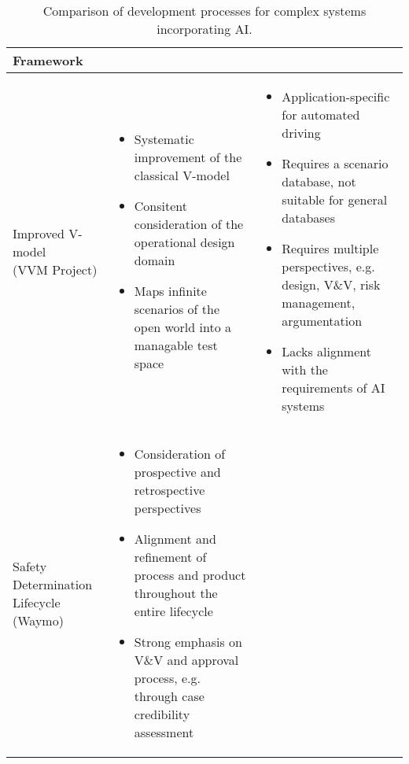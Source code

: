 \begin{table*}[]
	\centering
	\caption{Comparison of development processes for complex systems incorporating AI.}
	\begin{tabularx}{\linewidth}{l *{2}{>{\raggedright\arraybackslash}X}}
		\toprule
		Framework	& \makecell{Advantages} & \makecell{Disadvantages}  \\
		\midrule
		\makecell[l]{Improved V-model \\ \tiny{(VVM Project)}} \vspace*{-0.4cm} &  \vspace*{-0.4cm} \begin{itemize}
			\item Systematic improvement of the classical V-model
			\item Consitent consideration of the operational design domain
			\item Maps infinite scenarios of the open world
			into a managable test space
		\end{itemize} \vspace*{-0.4cm} &  \vspace*{-0.4cm}
		\begin{itemize}
			\item Application-specific for automated driving 
			\item Requires a scenario database, not suitable for general databases
			\item Requires multiple perspectives, e.g. design, V\&V, risk management, argumentation
			\item Lacks alignment with the requirements of AI systems
		\end{itemize} \vspace*{-0.4cm}  \\
		\midrule
		\makecell[l]{Safety Determination Lifecycle \\ \tiny{(Waymo)}} \vspace*{-0.4cm} &  \vspace*{-0.4cm}
		\begin{itemize}
			\item Consideration of prospective and retrospective perspectives
			\item Alignment and refinement of process and product throughout the entire lifecycle
			\item Strong emphasis on V\&V and approval process, e.g. through case credibility assessment
		\end{itemize} \vspace*{-0.4cm} &  \vspace*{-0.4cm}

\end{tabularx}
\end{table*}
